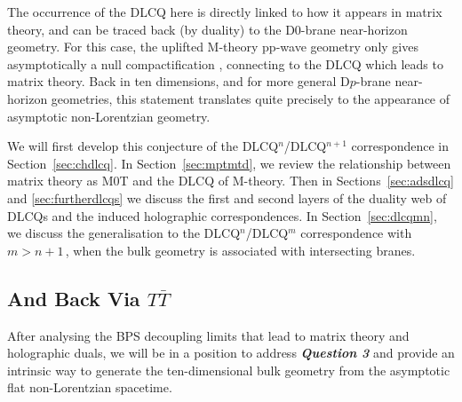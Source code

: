 \documentclass[11pt]{article}
\renewcommand{\emph}[1]{\textit{#1}}
\begin{document}
The occurrence of the DLCQ here is directly linked to how it appears in matrix theory, and can be traced back (by duality) to the D0-brane near-horizon geometry.
For this case, the uplifted M-theory pp-wave geometry only gives asymptotically a null compactification \cite{Hyun:1997zt, Balasubramanian:1997kd, Polchinski:1999br}, connecting to the DLCQ which leads to matrix theory.
Back in ten dimensions, and for more general D$p$-brane near-horizon geometries, this statement translates quite precisely to the appearance of asymptotic non-Lorentzian geometry.

We will first develop this conjecture of the DLCQ${}^{n}$/DLCQ${}^{n+1}$ correspondence in Section~\ref{sec:chdlcq}. In Section~\ref{sec:mptmtd}, we review the relationship between matrix theory as M0T and the DLCQ of M-theory. 
Then in Sections~\ref{sec:adsdlcq} and \ref{sec:furtherdlcqs} we discuss the first and second layers of the duality web of DLCQs and the induced holographic correspondences. In Section~\ref{sec:dlcqmn}, we discuss the generalisation to the DLCQ${}^{n}$/DLCQ${}^{m}$ correspondence with $m > n+1$\,, when the bulk geometry is associated with intersecting branes. 

\subsection{And Back Via \texorpdfstring{$T\bar{T}$}{TTbar}}

After analysing the BPS decoupling limits that lead to matrix theory and holographic duals, we will be in a position to address \emph{\textbf{Question 3}} and provide an intrinsic way to generate the ten-dimensional bulk geometry from the asymptotic flat non-Lorentzian spacetime. 

\vspace{3mm}
\end{document}
